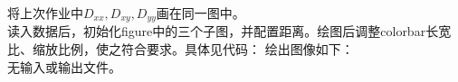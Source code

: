 \documentclass{ctexart}
\begin{document}
\begin{answer}

    将上次作业中$D_{xx}, D_{xy}, D_{yy}$画在同一图中。\\

    读入数据后，初始化figure中的三个子图，并配置距离。绘图后调整colorbar长宽比、缩放比例，使之符合要求。具体见代码：
    绘出图像如下：
     \\
    无输入或输出文件。

\end{answer}
\end{document}
